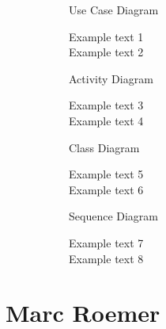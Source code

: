 \documentclass{article}
\begin{document}
	\begin{figure}[htbp]
		\centering
		\begin{subfigure}{\textwidth}
			\resizebox{\textwidth}{!}{}
			\caption{Use Case Diagram}
		\end{subfigure}
		\begin{subfigure}{\textwidth}
			Example text 1 \\
			Example text 2
		\end{subfigure}
	\end{figure}
	
	\begin{figure}[htbp]
		\centering
		\begin{subfigure}{\textwidth}
			\resizebox{\textwidth}{!}{}
			\caption{Activity Diagram}
		\end{subfigure}
		\begin{subfigure}{\textwidth}
			Example text 3 \\
			Example text 4
		\end{subfigure}
	\end{figure}
	
	\begin{figure}[htbp]
		\centering
		\begin{subfigure}{\textwidth}
			\resizebox{\textwidth}{!}{}
			\caption{Class Diagram}
		\end{subfigure}
		\begin{subfigure}{\textwidth}
			Example text 5 \\
			Example text 6
		\end{subfigure}
	\end{figure}
	
	\begin{figure}[htbp]
		\centering
		\begin{subfigure}{\textwidth}
			\resizebox{\textwidth}{!}{}
			\caption{Sequence Diagram}
		\end{subfigure}
		\begin{subfigure}{\textwidth}
			Example text 7 \\
			Example text 8
		\end{subfigure}
	\end{figure}
\newpage


\section{Marc Roemer}
\end{document}
